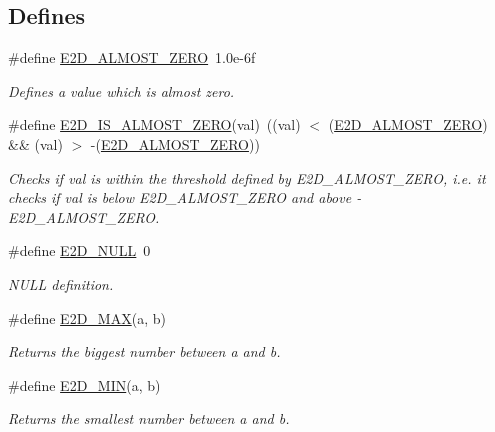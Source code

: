 \subsection*{Defines}
\begin{DoxyCompactItemize}
\item 
\#define \hyperlink{group__Ez2DS_ga48ffc9ed217e38fc9cd7cf8f9894d63c}{E2\-D\-\_\-\-A\-L\-M\-O\-S\-T\-\_\-\-Z\-E\-R\-O}~1.\-0e-\/6f
\begin{DoxyCompactList}\small\item\em Defines a value which is almost zero. \end{DoxyCompactList}\item 
\#define \hyperlink{group__Ez2DS_ga5f5051e054baa41a7a7048bd205bc1e3}{E2\-D\-\_\-\-I\-S\-\_\-\-A\-L\-M\-O\-S\-T\-\_\-\-Z\-E\-R\-O}(val)~((val) $<$ (\hyperlink{group__Ez2DS_ga48ffc9ed217e38fc9cd7cf8f9894d63c}{E2\-D\-\_\-\-A\-L\-M\-O\-S\-T\-\_\-\-Z\-E\-R\-O}) \&\& (val) $>$ -\/(\hyperlink{group__Ez2DS_ga48ffc9ed217e38fc9cd7cf8f9894d63c}{E2\-D\-\_\-\-A\-L\-M\-O\-S\-T\-\_\-\-Z\-E\-R\-O}))
\begin{DoxyCompactList}\small\item\em Checks if val is within the threshold defined by E2\-D\-\_\-\-A\-L\-M\-O\-S\-T\-\_\-\-Z\-E\-R\-O, i.\-e. it checks if val is below E2\-D\-\_\-\-A\-L\-M\-O\-S\-T\-\_\-\-Z\-E\-R\-O and above -\/ E2\-D\-\_\-\-A\-L\-M\-O\-S\-T\-\_\-\-Z\-E\-R\-O. \end{DoxyCompactList}\item 
\hypertarget{group__Ez2DS_gae6c89cca978cb0aa64dc7034b016f5cd}{\#define \hyperlink{group__Ez2DS_gae6c89cca978cb0aa64dc7034b016f5cd}{E2\-D\-\_\-\-N\-U\-L\-L}~0}\label{group__Ez2DS_gae6c89cca978cb0aa64dc7034b016f5cd}

\begin{DoxyCompactList}\small\item\em N\-U\-L\-L definition. \end{DoxyCompactList}\item 
\#define \hyperlink{group__Ez2DS_ga1cd9ecc64e25100eeb04dc1b08c28fc1}{E2\-D\-\_\-\-M\-A\-X}(a, b)
\begin{DoxyCompactList}\small\item\em Returns the biggest number between a and b. \end{DoxyCompactList}\item 
\#define \hyperlink{group__Ez2DS_gaf5964c56c46211897a998a087d4c3a66}{E2\-D\-\_\-\-M\-I\-N}(a, b)
\begin{DoxyCompactList}\small\item\em Returns the smallest number between a and b. \end{DoxyCompactList}\end{DoxyCompactItemize}
